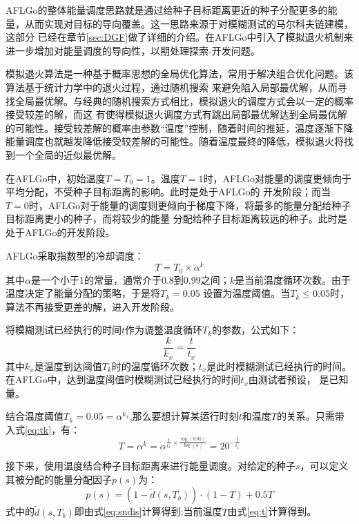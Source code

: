 \documentclass[bachelor]{njupthesis}
\begin{document}
AFLGo的整体能量调度思路就是通过给种子目标距离更近的种子分配更多的能量，从而实现对目标的导向覆盖。这一思路来源于对模糊测试的马尔科夫链建模，这部分
已经在章节\ref{sec:DGF}做了详细的介绍。在AFLGo中引入了模拟退火机制来进一步增加对能量调度的导向性，以期处理探索-开发问题。

模拟退火算法是一种基于概率思想的全局优化算法，常用于解决组合优化问题。该算法基于统计力学中的退火过程，通过随机搜索
来避免陷入局部最优解，从而寻找全局最优解。与经典的随机搜索方式相比，模拟退火的调度方式会以一定的概率接受较差的解，而这
有使得模拟退火调度方式有跳出局部最优解达到全局最优解的可能性。接受较差解的概率由参数“温度”控制，随着时间的推延，温度逐渐下降
能量调度也就越发降低接受较差解的可能性。随着温度最终的降低，模拟退火将找到一个全局的近似最优解。

在AFLGo中，初始温度$T=T_0=1$。温度$T=1$时，AFLGo对能量的调度更倾向于平均分配，不受种子目标距离的影响。此时是处于AFLGo的
开发阶段；而当$T=0$时，AFLGo对于能量的调度则更倾向于梯度下降，将最多的能量分配给种子目标距离更小的种子，而将较少的能量
分配给种子目标距离较远的种子。此时是处于AFLGo的开发阶段。

AFLGo采取指数型的冷却调度：
\begin{equation}
	T=T_0 \times \alpha^k	
\end{equation}
其中$\alpha$是一个小于1的常量，通常介于0.8到0.99之间；$k$是当前温度循环次数。由于温度决定了能量分配的策略，于是将$T_k=0.05$
设置为温度阈值。当$T_k \leq 0.05$时，算法不再接受更差的解，进入开发阶段。

将模糊测试已经执行的时间$t$作为调整温度循环$T_k$的参数，公式如下：
\begin{equation}\label{eq:tk}
	\frac{k}{k_x}=\frac{t}{t_x}	
\end{equation}
其中$k_x$是温度到达阈值$T_k$时的温度循环次数；$t_x$是此时模糊测试已经执行的时间。在AFLGo中，达到温度阈值时模糊测试已经执行的时间$t_x$由测试者预设，
是已知量。

结合温度阈值$T_k=0.05=\alpha^{k_x}$,那么要想计算某运行时刻$t$和温度$T$的关系。只需带入式\ref{eq:tk}，有：
\begin{equation}\label{eq:t}
	T=\alpha^k=\alpha^{\frac{t}{t_x}\times\frac{\log(0.05)}{\log(\alpha)}}=20^{-\frac{t}{t_x}}
\end{equation}

接下来，使用温度结合种子目标距离来进行能量调度。对给定的种子$s$，可以定义其被分配的能量分配因子$p(s)$为：
\begin{equation}\label{eq:energy}
	p(s)=(1-\widetilde{d}(s,T_b))\cdot(1-T)+0.5T
\end{equation}
式中的$\widetilde{d}(s,T_b)$即由式\ref{eq:sndis}计算得到;当前温度$T$由式\ref{eq:t}计算得到。
\end{document}
